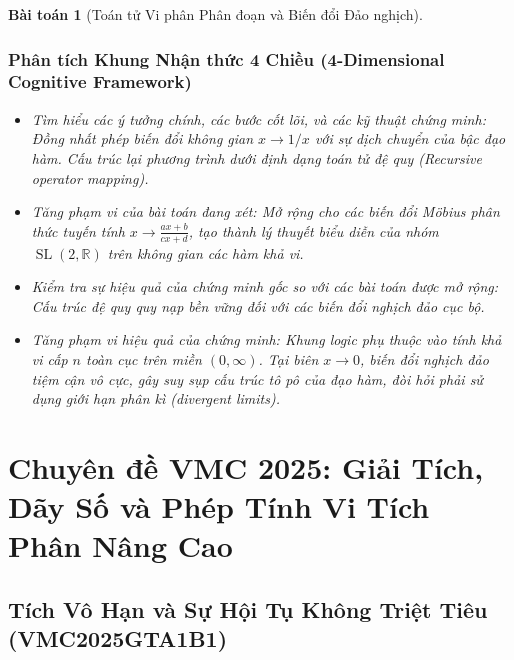 \documentclass{article}
\newtheorem{baitoan}{Bài toán}
\begin{document}
\begin{baitoan}[Toán tử Vi phân Phân đoạn và Biến đổi Đảo nghịch]


 \subsubsection*{Phân tích Khung Nhận thức 4 Chiều (4-Dimensional Cognitive Framework)}
 \begin{itemize}
 \item \textit{Tìm hiểu các ý tưởng chính, các bước cốt lõi, và các kỹ thuật chứng minh}: Đồng nhất phép biến đổi không gian $x \to 1/x$ với sự dịch chuyển của bậc đạo hàm. Cấu trúc lại phương trình dưới định dạng toán tử đệ quy (Recursive operator mapping).
 \item \textit{Tăng phạm vi của bài toán đang xét}: Mở rộng cho các biến đổi Möbius phân thức tuyến tính $x \to \frac{ax+b}{cx+d}$, tạo thành lý thuyết biểu diễn của nhóm $\operatorname{SL}(2, \mathbb{R})$ trên không gian các hàm khả vi.
 \item \textit{Kiểm tra sự hiệu quả của chứng minh gốc so với các bài toán được mở rộng}: Cấu trúc đệ quy quy nạp bền vững đối với các biến đổi nghịch đảo cục bộ.
 \item \textit{Tăng phạm vi hiệu quả của chứng minh}: Khung logic phụ thuộc vào tính khả vi cấp $n$ toàn cục trên miền $(0, \infty)$. Tại biên $x \to 0$, biến đổi nghịch đảo tiệm cận vô cực, gây suy sụp cấu trúc tô pô của đạo hàm, đòi hỏi phải sử dụng giới hạn phân kì (divergent limits).
 \end{itemize}
\end{baitoan}




\section{Chuyên đề VMC 2025: Giải Tích, Dãy Số và Phép Tính Vi Tích Phân Nâng Cao}

\subsection{Tích Vô Hạn và Sự Hội Tụ Không Triệt Tiêu (VMC2025GTA1B1)}
\end{document}
